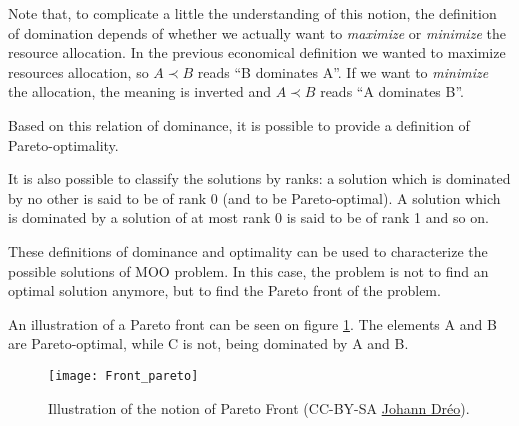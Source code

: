 
Note that, to complicate a little the understanding of this notion, the definition of domination depends of whether we actually want to \emph{maximize} or \emph{minimize} the resource allocation. In the previous economical definition we wanted to maximize resources allocation, so \(A \prec B\) reads \enquote{B dominates A}. If we want to \emph{minimize} the allocation, the meaning is inverted and \(A \prec B\) reads \enquote{A dominates B}.

Based on this relation of dominance, it is possible to provide a definition of Pareto-optimality.



It is also possible to classify the solutions by ranks: a solution which is dominated by no other is said to be of rank 0 (and to be Pareto-optimal). A solution which is dominated by a solution of at most rank 0 is said to be of rank 1 and so on.

These definitions of dominance and optimality can be used to characterize the possible solutions of MOO problem. In this case, the problem is not to find an optimal solution anymore, but to find the Pareto front of the problem.

An illustration of a Pareto front can be seen on figure \ref{Front_Pareto}. The elements A and B are Pareto-optimal, while C is not, being dominated by A and B.

\begin{figure}
\centering
\texttt{[image: Front\_pareto]}\\
\caption{Illustration of the notion of Pareto Front (CC-BY-SA \href{http://en.wikipedia.org/wiki/File:Front_pareto.svg}{Johann Dréo}).}
\label{Front_Pareto}
\end{figure}

